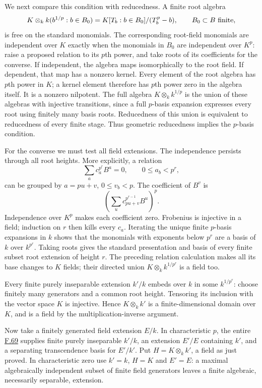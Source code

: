 \documentclass[11pt,a4paper,openany]{report}
\begin{document}
We next compare this condition with reducedness. A finite root algebra \[K\otimes_k k(b^{1/p}:b\in B_0)
=K[T_b:b\in B_0]/(T_b^p-b),\qquad B_0\subset B\ {\rm finite},\] is free on the standard monomials. The corresponding root-field monomials are independent over \(K\) exactly when the monomials in \(B_0\) are independent over \(K^p\): raise a proposed relation to its \(p\)th power, and take roots of its coefficients for the converse. If independent, the algebra maps isomorphically to the root field. If dependent, that map has a nonzero kernel. Every element of the root algebra has \(p\)th power in \(K\); a kernel element therefore has \(p\)th power zero in the algebra itself. It is a nonzero nilpotent. The full algebra \(K\otimes_k k^{1/p}\) is the union of these algebras with injective transitions, since a full \(p\)-basis expansion expresses every root using finitely many basis roots. Reducedness of this union is equivalent to reducedness of every finite stage. Thus geometric reducedness implies the \(p\)-basis condition.

For the converse we must test all field extensions. The independence persists through all root heights. More explicitly, a relation \[\sum_a c_a^{p^r}B^a=0,\qquad 0\leq a_b<p^r,\] can be grouped by \(a=pu+v\), \(0\leq v_b<p\). The coefficient of \(B^v\) is \[\left(\sum_u c_{pu+v}^{p^{r-1}}B^u\right)^p.\] Independence over \(K^p\) makes each coefficient zero. Frobenius is injective in a field; induction on \(r\) then kills every \(c_a\). Iterating the unique finite \(p\)-basis expansions in \(k\) shows that the monomials with exponents below \(p^r\) are a basis of \(k\) over \(k^{p^r}\). Taking roots gives the standard presentation and basis of every finite subset root extension of height \(r\). The preceding relation calculation makes all its base changes to \(K\) fields; their directed union \(K\otimes_k k^{1/p^r}\) is a field too.

Every finite purely inseparable extension \(k'/k\) embeds over \(k\) in some \(k^{1/p^r}\): choose finitely many generators and a common root height. Tensoring its inclusion with the vector space \(K\) is injective. Hence \(K\otimes_k k'\) is a finite-dimensional domain over \(K\), and is a field by the multiplication-inverse argument.

Now take a finitely generated field extension \(E/k\). In characteristic \(p\), the entire \hyperref[AG-RG-S05-algebra-lemma-make-separably-generated]{F.69} supplies finite purely inseparable \(k'/k\), an extension \(E'/E\) containing \(k'\), and a separating transcendence basis for \(E'/k'\). Put \(H=K\otimes_k k'\), a field as just proved. In characteristic zero use \(k'=k\), \(H=K\) and \(E'=E\): a maximal algebraically independent subset of finite field generators leaves a finite algebraic, necessarily separable, extension.
\end{document}
